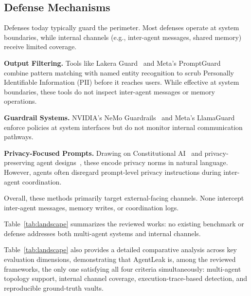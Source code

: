 \documentclass{ieeeaccess}
\begin{document}
\subsection{Defense Mechanisms}

Defenses today typically guard the perimeter. Most defenses operate at system boundaries, while internal channels (e.g., inter-agent messages, shared memory) receive limited coverage.

\textbf{Output Filtering.} Tools like Lakera Guard~\cite{lakera2024guard} and Meta's PromptGuard~\cite{meta2024promptguard} combine pattern matching with named entity recognition to scrub Personally Identifiable Information (PII) before it reaches users. While effective at system boundaries, these tools do not inspect inter-agent messages or memory operations.

\textbf{Guardrail Systems.} NVIDIA's NeMo Guardrails~\cite{rebedea2023nemoguardrailstoolkitcontrollable} and Meta's LlamaGuard~\cite{inan2023llamaguardllmbasedinputoutput} enforce policies at system interfaces but do not monitor internal communication pathways.

\textbf{Privacy-Focused Prompts.} Drawing on Constitutional AI~\cite{bai2022constitutionalaiharmlessnessai} and privacy-preserving agent designs~\cite{bagdasarian2024airgapagentprotectingprivacyconsciousconversational}, these encode privacy norms in natural language. However, agents often disregard prompt-level privacy instructions during inter-agent coordination.

Overall, these methods primarily target external-facing channels. None intercept inter-agent messages, memory writes, or coordination logs.

Table~\ref{tab:landscape} summarizes the reviewed works: no existing benchmark or defense addresses both multi-agent systems and internal channels.

Table~\ref{tab:landscape} also provides a detailed comparative analysis across key evaluation dimensions, demonstrating that AgentLeak is, among the reviewed frameworks, the only one satisfying all four criteria simultaneously: multi-agent topology support, internal channel coverage, execution-trace-based detection, and reproducible ground-truth vaults.
\end{document}
